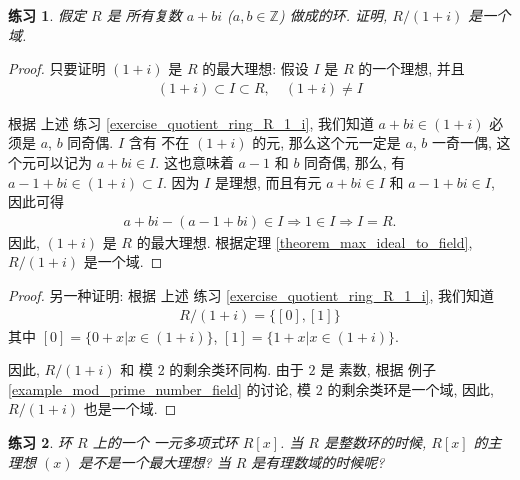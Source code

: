 \documentclass[utf8]{ctexbook}
\newtheorem{exercise}{练习}[section]
\begin{document}
\begin{exercise}
假定 $R$ 是 所有复数 $a+bi$ ($a,b \in \mathbb{Z}$) 做成的环. 证明, $R/ (1+i)$ 是一个域.
\end{exercise}

\begin{proof}
只要证明 $(1+i)$ 是 $R$ 的最大理想: 假设 $I$ 是 $R$ 的一个理想, 并且
\begin{align*}
(1+i) \subset I \subset R, \quad  (1+i) \neq I
\end{align*}

根据 上述 练习 \ref{exercise_quotient_ring_R_1_i}, 我们知道 $a+bi \in (1+i)$ 必须是 $a$, $b$ 同奇偶. $I$ 含有 不在 $(1+i)$ 的元, 那么这个元一定是 $a$, $b$ 一奇一偶, 这个元可以记为 $a + bi \in I$. 这也意味着 $a-1 $ 和 $b$ 同奇偶, 那么, 有 $a - 1 + b i \in (1+i) \subset I $. 因为 $I$ 是理想, 而且有元 $a + bi \in I$ 和 $a -1 + bi \in I$, 因此可得
\begin{align*}
a + bi - (a-1 +bi) \in I \Longrightarrow 1 \in I \Longrightarrow I = R.
\end{align*}
因此, $(1+i)$ 是 $R$ 的最大理想. 根据定理 \ref{theorem_max_ideal_to_field}, $R/(1+i)$ 是一个域.
\end{proof}

\begin{proof}
另一种证明: 根据 上述 练习 \ref{exercise_quotient_ring_R_1_i}, 我们知道 
\begin{align*}
R/(1+i) = \{ [0], [1] \}
\end{align*}
其中 $[0] = \{0 + x| x \in (1+i)\}$, $[1] = \{1 + x| x \in (1+i)\}$. 

因此, $R/(1+i)$ 和 模 $2$ 的剩余类环同构. 由于 $2$ 是 素数, 根据 例子 \ref{example_mod_prime_number_field} 的讨论, 模 $2$ 的剩余类环是一个域, 因此, $R/(1+i)$ 也是一个域.
\end{proof}


\begin{exercise}
环 $R$ 上的一个 一元多项式环 $R[x]$. 当 $R$ 是整数环的时候, $R[x]$ 的主理想 $(x)$ 是不是一个最大理想? 当 $R$ 是有理数域的时候呢?
\end{exercise}
\end{document}
